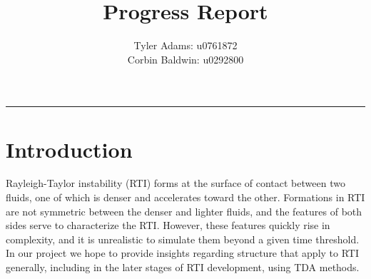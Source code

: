 \documentclass[12pt, fullpage,letterpaper]{article}
\title{Progress Report}
\author{Tyler Adams: u0761872 \\Corbin Baldwin: u0292800}
\begin{document}
	\maketitle 
	\hrule 
	\vskip 0.5cm
	\section*{\normalfont Introduction}
	Rayleigh-Taylor instability (RTI) forms at the surface of contact between two fluids, one of which is denser and accelerates toward the other. Formations in RTI are not symmetric between the denser and lighter fluids, and the features of both sides serve to characterize the RTI. However, these features quickly rise in complexity, and it is unrealistic to simulate them beyond a given time threshold. In our project we hope to provide insights regarding structure that apply to RTI generally, including in the later stages of RTI development, using TDA methods.
	
\end{document}
